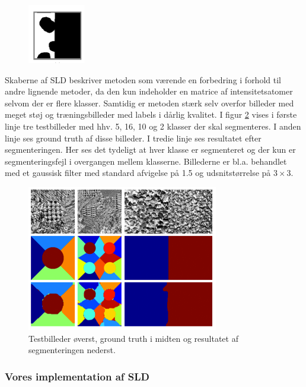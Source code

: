 \begin{figure}[H]
		\centering
		\includegraphics[scale=1]{files/postmethod/img/dict_5.png}
	\caption{\label{fig:postmethod_sld_resulting}}
\end{figure}

Skaberne af SLD beskriver metoden som værende en forbedring i forhold til andre lignende metoder, da den kun indeholder en matrice af intensitetsatomer selvom der er flere klasser. Samtidig er metoden stærk selv overfor billeder med meget støj og træningsbilleder med labels i dårlig kvalitet. I figur \ref{fig:postmethod_sld_testing} vises i første linje tre testbilleder med hhv. 5, 16, 10 og 2 klasser der skal segmenteres. I anden linje ses ground truth af disse billeder. I tredie linje ses resultatet efter segmenteringen. Her ses det tydeligt at hver klasse er segmenteret og der kun er segmenteringsfejl i overgangen mellem klasserne. Billederne er bl.a. behandlet med et gaussisk filter med standard afvigelse på 1.5 og udsnitstørrelse på $3\times3$.

\begin{figure}[H]
		\centering
		\includegraphics[scale=1]{files/postmethod/img/dict_6.png}
	\caption{Testbilleder øverst, ground truth i midten og resultatet af segmenteringen nederst.\label{fig:postmethod_sld_testing}}
\end{figure}

\subsubsection{Vores implementation af SLD}

